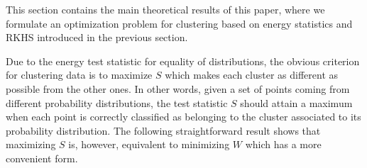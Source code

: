 \documentclass[aps,preprint,nofootinbib,floatfix]{revtex4-1}
\begin{document}



This section contains the main theoretical results of this paper, where 
we formulate an optimization problem for clustering 
based on energy statistics and RKHS introduced in the previous section.

Due to the energy test statistic for equality of distributions,
the obvious
criterion for clustering data is to 
maximize $S$ which makes 
each cluster as different
as possible from the other ones.
In other words, given a set of points coming from different probability
distributions, the test statistic $S$ should attain a maximum when 
each point is correctly
classified as belonging to the cluster associated to its probability
distribution.
The following 
straightforward result
shows that maximizing $S$ is, however, equivalent to minimizing
$W$ which has a more convenient form.
\end{document}
